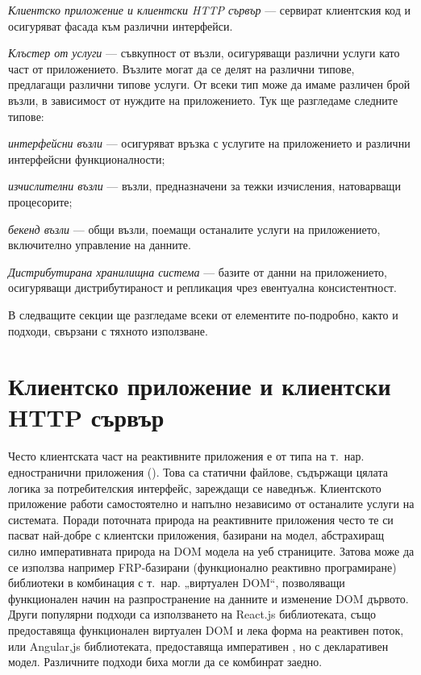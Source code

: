 \begin{itemize*}
  \item \emph{Клиентско приложение и клиентски HTTP сървър} — сервират клиентския код и осигуряват фасада към различни интерфейси.
  
  \item \emph{Клъстер от услуги} — съвкупност от възли, осигуряващи различни услуги като част от приложението. Възлите могат да се делят на различни типове, предлагащи различни типове услуги. От всеки тип може да имаме различен брой възли, в зависимост от нуждите на приложението. Тук ще разгледаме следните типове:
  
  \begin{itemize*}
    \item \emph{интерфейсни възли} — осигуряват връзка с услугите на приложението и различни интерфейсни функционалности;
    
    \item \emph{изчислителни възли} — възли, предназначени за тежки изчисления, натоварващи процесорите;
    
    \item \emph{бекенд възли} — общи възли, поемащи останалите услуги на приложението, включително управление на данните.
  \end{itemize*}
  
  \item \emph{Дистрибутирана хранилищна система} — базите от данни на приложението, осигуряващи дистрибутираност и репликация чрез евентуална консистентност.
\end{itemize*}

В следващите секции ще разгледаме всеки от елементите по-подробно, както и подходи, свързани с тяхното използване.

\section{Клиентско приложение и клиентски HTTP сървър}

Често клиентската част на реактивните приложения е от типа на т.~нар. едностранични приложения (). Това са статични файлове, съдържащи цялата логика за потребителския интерфейс, зареждащи се наведнъж. Клиентското приложение работи самостоятелно и напълно независимо от останалите услуги на системата. Поради поточната природа на реактивните приложения често те си пасват най-добре с клиентски приложения, базирани на  модел, абстрахиращ силно императивната природа на DOM модела на уеб страниците. Затова може да се използва например FRP-базирани (функционално реактивно програмиране) библиотеки в комбинация с т.~нар. „виртуален DOM“, позволяващи функционален начин на разпространение на данните и изменение DOM дървото. Други популярни подходи са използването на React.js библиотеката, също предоставяща функционален виртуален DOM и лека форма на реактивен поток, или Angular,js библиотеката, предоставяща императивен , но с декларативен модел. Различните подходи биха могли да се комбинрат заедно.

